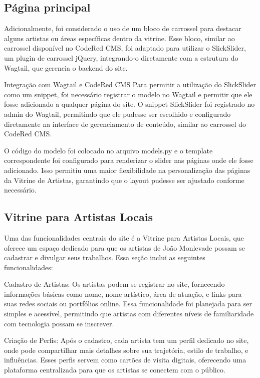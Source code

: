 \subsection{Página principal}

Adicionalmente, foi considerado o uso de um bloco de carrossel para destacar alguns artistas ou áreas específicas dentro da vitrine. Esse bloco, similar ao carrossel disponível no CodeRed CMS, foi adaptado para utilizar o SlickSlider, um plugin de carrossel jQuery, integrando-o diretamente com a estrutura do Wagtail, que gerencia o backend do site.

Integração com Wagtail e CodeRed CMS
Para permitir a utilização do SlickSlider como um snippet, foi necessário registrar o modelo no Wagtail e permitir que ele fosse adicionado a qualquer página do site. O snippet SlickSlider foi registrado no admin do Wagtail, permitindo que ele pudesse ser escolhido e configurado diretamente na interface de gerenciamento de conteúdo, similar ao carrossel do CodeRed CMS.

O código do modelo foi colocado no arquivo models.py e o template correspondente foi configurado para renderizar o slider nas páginas onde ele fosse adicionado. Isso permitiu uma maior flexibilidade na personalização das páginas da Vitrine de Artistas, garantindo que o layout pudesse ser ajustado conforme necessário.

\subsection{Vitrine para Artistas Locais}

Uma das funcionalidades centrais do site é a Vitrine para Artistas Locais, que oferece um espaço dedicado para que os artistas de João Monlevade possam se cadastrar e divulgar seus trabalhos. Essa seção inclui as seguintes funcionalidades:

Cadastro de Artistas: Os artistas podem se registrar no site, fornecendo informações básicas como nome, nome artístico, área de atuação, e links para suas redes sociais ou portfólios online. Essa funcionalidade foi planejada para ser simples e acessível, permitindo que artistas com diferentes níveis de familiaridade com tecnologia possam se inscrever.

Criação de Perfis: Após o cadastro, cada artista tem um perfil dedicado no site, onde pode compartilhar mais detalhes sobre sua trajetória, estilo de trabalho, e influências. Esses perfis servem como cartões de visita digitais, oferecendo uma plataforma centralizada para que os artistas se conectem com o público.

